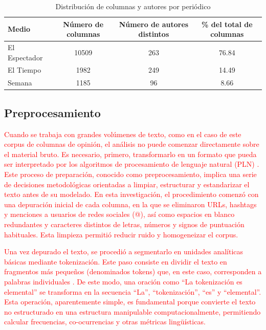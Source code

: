 \documentclass[11pt,a4paper]{article}
\begin{document}
	\begin{table}[H]
		\centering
		\caption{Distribución de columnas y autores por periódico}
		\label{tab:col_autores_periodico}
		\footnotesize
		\begin{tabular}{l c c c}
			\hline
			\textbf{Medio} & \textbf{Número de columnas} & \textbf{Número de autores distintos} & \textbf{\% del total de columnas} \\
			\hline
			El Espectador & 10509 & 263 & 76.84\\
			El Tiempo & 1982 &  249 & 14.49\\
			Semana & 1185 & 96  & 8.66\\
			\hline
		\end{tabular}
	\end{table}
	
	\subsection{Preprocesamiento}
	\textcolor{red}{
		Cuando se trabaja con grandes volúmenes de texto, como en el caso de este corpus de columnas de opinión, el análisis no puede comenzar directamente sobre el material bruto. Es necesario, primero, transformarlo en un formato que pueda ser interpretado por los algoritmos de procesamiento de lenguaje natural (PLN) \cite{Chai2022}. Este proceso de preparación, conocido como preprocesamiento, implica una serie de decisiones metodológicas orientadas a limpiar, estructurar y estandarizar el texto antes de su modelado. En esta investigación, el procedimiento comenzó con una depuración inicial de cada columna, en la que se eliminaron URLs, hashtags y menciones a usuarios de redes sociales (@), así como espacios en blanco redundantes y caracteres distintos de letras, números y signos de puntuación habituales. Esta limpieza permitió reducir ruido y homogeneizar el corpus.}
		
		\textcolor{red}{
		Una vez depurado el texto, se procedió a segmentarlo en unidades analíticas básicas mediante tokenización. Este paso consiste en dividir el texto en fragmentos más pequeños (denominados tokens) que, en este caso, corresponden a palabras individuales \cite{Tyagi_text}. De este modo, una oración como “La tokenización es elemental” se transforma en la secuencia “La”, “tokenización”, “es” y “elemental”. Esta operación, aparentemente simple, es fundamental porque convierte el texto no estructurado en una estructura manipulable computacionalmente, permitiendo calcular frecuencias, co-ocurrencias y otras métricas lingüísticas.}
		
\end{document}
